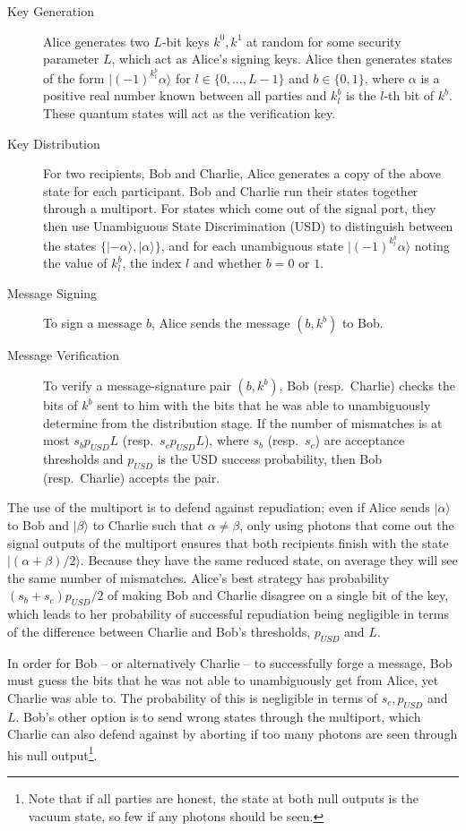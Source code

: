 \documentclass[%
 reprint,
 amsmath,amssymb,
 aps,
 pra,
]{revtex4-1}
\begin{document}
\begin{description}
\item[Key Generation]Alice generates two $L$-bit keys $k^0, k^1$ at random for some security parameter $L$, which act as Alice's signing keys. Alice then generates states of the form $|(-1)^{k^b_l}\alpha\rangle$ for $l \in \{0,...,L-1\}$ and $b \in \{0, 1\}$, where $\alpha$ is a positive real number known between all parties and $k^b_l$ is the $l$-th bit of $k^b$. These quantum states will act as the verification key.
\item[Key Distribution]For two recipients, Bob and Charlie, Alice generates a copy of the above state for each participant. Bob and Charlie run their states together through a multiport. For states which come out of the signal port, they then use Unambiguous State Discrimination (USD) \cite{Ivanovic1987257} to distinguish between the states $\{|-\alpha\rangle, |\alpha\rangle\}$, and for each unambiguous state $|(-1)^{k^b_l}\alpha\rangle$ noting the value of $k^b_l$, the index $l$ and whether $b = 0$ or $1$.
\item[Message Signing]To sign a message $b$, Alice sends the message $(b, k^b)$ to Bob.
\item[Message Verification]To verify a message-signature pair $(b, k^b)$, Bob (resp.\ Charlie) checks the bits of $k^b$ sent to him with the bits that he was able to unambiguously determine from the distribution stage. If the number of mismatches is at most $s_bp_{USD}L$ (resp.\ $s_cp_{USD}L$), where $s_b$ (resp.\ $s_c$) are acceptance thresholds and $p_{USD}$ is the USD success probability, then Bob (resp.\ Charlie) accepts the pair.
\end{description}

The use of the multiport is to defend against repudiation; even if Alice sends $|\alpha\rangle$ to Bob and $|\beta\rangle$ to Charlie such that $\alpha \neq \beta$, only using photons that come out the signal outputs of the multiport ensures that both recipients finish with the state $|(\alpha + \beta)/2\rangle$. Because they have the same reduced state, on average they will see the same number of mismatches. Alice's best strategy has probability $(s_b + s_c)p_{USD}/2$ of making Bob and Charlie disagree on a single bit of the key, which leads to her probability of successful repudiation being negligible in terms of the difference between Charlie and Bob's thresholds, $p_{USD}$ and $L$.

In order for Bob -- or alternatively Charlie -- to successfully forge a message, Bob must guess the bits that he was not able to unambiguously get from Alice, yet Charlie was able to. The probability of this is negligible in terms of $s_c, p_{USD}$ and $L$. Bob's other option is to send wrong states through the multiport, which Charlie can also defend against by aborting if too many photons are seen through his null output\footnote{Note that if all parties are honest, the state at both null outputs is the vacuum state, so few if any photons should be seen.}.
\end{document}
